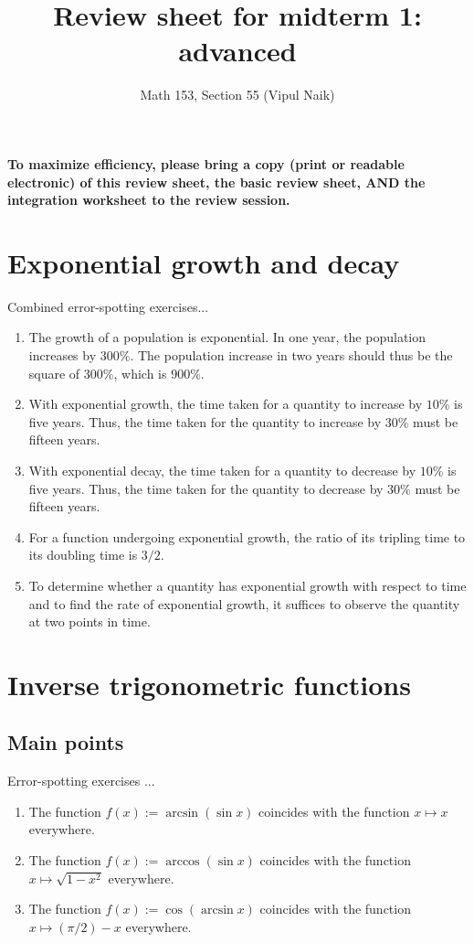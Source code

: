 \documentclass[10pt]{amsart}
\title{Review sheet for midterm 1: advanced}
\author{Math 153, Section 55 (Vipul Naik)}
\begin{document}
\maketitle

{\bf To maximize efficiency, please bring a copy (print or readable
electronic) of this review sheet, the basic review sheet, AND the
integration worksheet to the review session.}

\section{Exponential growth and decay}

Combined error-spotting exercises...

\begin{enumerate}
\item The growth of a population is exponential. In one year, the
  population increases by $300\%$. The population increase in two
  years should thus be the square of $300\%$, which is $900\%$.
\item With exponential growth, the time taken for a quantity to
  increase by $10\%$ is five years. Thus, the time taken for the
  quantity to increase by $30\%$ must be fifteen years.
\item With exponential decay, the time taken for a quantity to
  decrease by $10\%$ is five years. Thus, the time taken for the
  quantity to decrease by $30\%$ must be fifteen years.
\item For a function undergoing exponential growth, the ratio of its
  tripling time to its doubling time is $3/2$.
\item To determine whether a quantity has exponential growth with
  respect to time and to find the rate of exponential growth, it
  suffices to observe the quantity at two points in time.
\end{enumerate}

\section{Inverse trigonometric functions}

\subsection{Main points}

Error-spotting exercises ...

\begin{enumerate}
\item The function $f(x):= \arcsin(\sin x)$ coincides with the
  function $x \mapsto  x$ everywhere.
\item The function $f(x) := \arccos(\sin x)$ coincides with the
  function $x \mapsto \sqrt{1 - x^2}$ everywhere.
\item The function $f(x) := \cos(\arcsin x)$ coincides with the
  function $x \mapsto (\pi/2) - x$ everywhere.
\end{enumerate}
\end{document}
